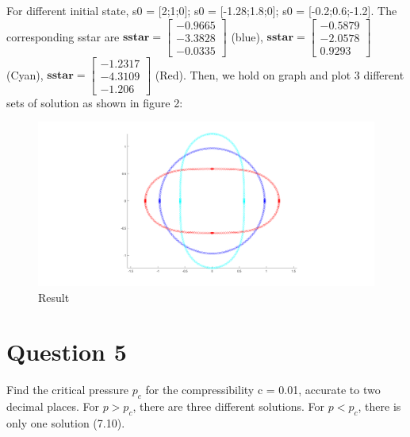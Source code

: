 \documentclass{article}
\begin{document}
For different initial state, s0 = [2;1;0]; s0 = [-1.28;1.8;0]; s0 = [-0.2;0.6;-1.2]. The corresponding sstar are $\mathbf{sstar}=\left[\begin{array}{l}
	-0.9665 \\
	-3.3828 \\
	-0.0335
\end{array}\right]
$ (blue), $\mathbf{sstar}=\left[\begin{array}{l}
	-0.5879 \\
	-2.0578 \\
	0.9293
\end{array}\right]
$ (Cyan), $\mathbf{sstar}=\left[\begin{array}{l}
	-1.2317 \\
	-4.3109 \\
	-1.206
\end{array}\right]
$ (Red). Then, we hold on graph and plot 3 different sets of solution as shown in figure 2:

\begin{figure}[htbp]  %
	\centering    %
	\centering          %
	\includegraphics[width=1\textwidth]{fig/Q4-NEW.png}   %
	\caption{Result} 
	\label{fig1}  %
\end{figure}





\section*{Question 5} 
Find the critical pressure $p_c$ for the compressibility c = 0.01, accurate to two decimal
places. For $p > p_c$, there are three different solutions. For $p < p_c$, there is only one
solution (7.10).
\end{document}
